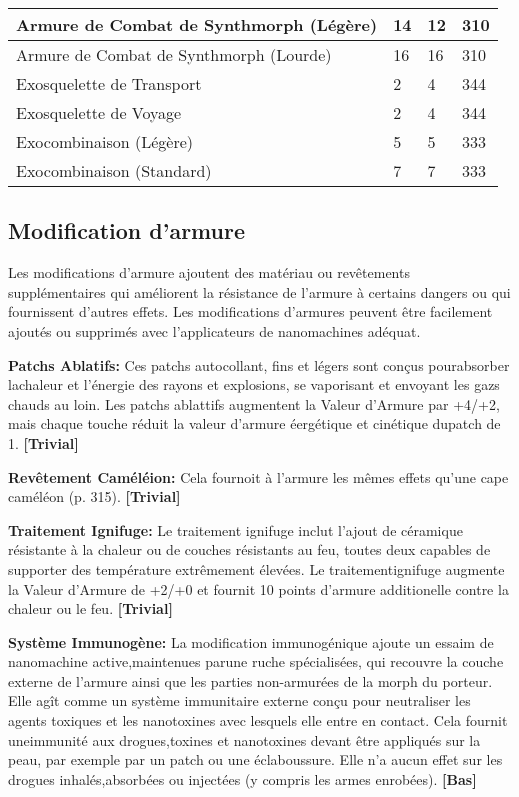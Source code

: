 {{\begin{table}
\begin{tabular}{|l|l|l|l|}
Armure de Combat de Synthmorph (Légère)	&14	&12	&310	\\ \hline

Armure de Combat de Synthmorph (Lourde)	&16	&16	&310	\\ \hline

Exosquelette de Transport	&2	&4	&344	\\ \hline

Exosquelette de Voyage	&2	&4	&344	\\ \hline

Exocombinaison (Légère)	&5	&5	&333	\\ \hline

Exocombinaison (Standard)	&7	&7	&333	\\ \hline

\end{tabular} \label{tab:armor-values} \end{table} 



\subsection{Modification d'armure} \label{sec:armor-mods} 

Les modifications d'armure ajoutent des matériau ou revêtements supplémentaires qui améliorent la résistance de l'armure à certains dangers ou qui fournissent d'autres effets. Les modifications d'armures peuvent être facilement ajoutés ou supprimés avec l'applicateurs de nanomachines adéquat. 

\textbf{Patchs Ablatifs:} Ces patchs autocollant, fins et légers sont conçus pourabsorber lachaleur et l'énergie des rayons et explosions, se vaporisant et envoyant les gazs chauds au loin. Les patchs ablattifs augmentent la Valeur d'Armure par +4/+2, mais chaque touche réduit la valeur d'armure éergétique et cinétique dupatch de 1. \textbf{[Trivial]} 

\textbf{Revêtement Caméléion:} Cela fournoit à l'armure les mêmes effets qu'une cape caméléon (p. 315). \textbf{[Trivial]} 

\textbf{Traitement Ignifuge:} Le traitement ignifuge inclut l'ajout de céramique résistante à la chaleur ou de couches résistants au feu, toutes deux capables de supporter des température extrêmement élevées. Le traitementignifuge augmente la Valeur d'Armure de +2/+0 et fournit 10 points d'armure additionelle contre la chaleur ou le feu. \textbf{[Trivial]} 

\textbf{Système Immunogène:} La modification immunogénique ajoute un essaim de nanomachine active,maintenues parune ruche spécialisées, qui recouvre la couche externe de l'armure ainsi que les parties non-armurées de la morph du porteur. Elle agît comme un système immunitaire externe conçu pour neutraliser les agents toxiques et les nanotoxines avec lesquels elle entre en contact. Cela fournit uneimmunité aux drogues,toxines et nanotoxines devant être appliqués sur la peau, par exemple par un patch ou une éclaboussure. Elle n'a aucun effet sur les drogues inhalés,absorbées ou injectées (y compris les armes enrobées). \textbf{[Bas]} 

}}
